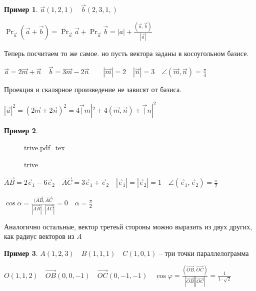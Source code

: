 \documentclass{book}
\theoremstyle{definition}
\newtheorem*{example}{Пример}
\newcommand\vect[1]{\overset{\longrightarrow}{#1}}
\newcommand{\incfig}[1]{%
    \def\svgwidth{\columnwidth}
    {#1.pdf_tex}
}
\begin{document}
    \begin{example}
        $\vec a(1, 2, 1)\quad \vec b\left( 2, 3, 1,  \right) $ 

        $\Pr_{\vec a}(\vec a + \vec b) = \Pr_{\vec a}\vec a + \Pr_{\vec a} \vec b = \left| a \right| + \frac{(\vec a,\vec b)}{\left| \vec a \right| }$
    
    Теперь посчитаем то же самое. но пусть вектора заданы в косоугольном базисе.

    $\vec a = 2\vec m + \vec n\quad \vec b = 3\vec m - 2\vec n\qquad \left| \vec m \right| =2 \quad \left| \vec n \right|  = 3\quad \angle(\vec m, \vec n) = \frac{\pi }{4}$

    Проекция и скалярное произведение не зависят от базиса.

    $\left| \vec a \right|^2  = (2\vec m + 2\vec n)^2 = 4\vec |m|^2 + 4(\vec m, \vec n) + \vec |n|^2$
    \end{example}
    \begin{example}
\begin{figure}[ht]
    \centering
    \incfig{trive}
    \caption{trive}
    \label{fig:trive}
\end{figure}

$\vec{AB} = 2\vec e_1 - 6\vec e_2\quad \vec{AC} = 3\vec e_1 + \vec e_2\quad \left| \vec e_1 \right|  = \left| \vec e_2 \right| =1\quad \angle\left( \vec e_1, \vec e_2 \right)  = \frac{\pi}{2} $ 

$\cos\alpha = \frac{(\vec{AB}, \vec {AC}}{\left| \vec{AB} \right| \cdot \left| \vec{AC} \right| } = 0\quad \alpha = \frac{\pi }{2}$

Аналогично остальные, вектор третеьй стороны можно выразить из двух других, как радиус векторов из $A$
    \end{example}

\begin{example}
    $A(1, 2, 3)\quad B(1, 1, 1)\quad C(1, 0, 1)$ -- три точки параллелограмма

    $O(1, 1, 2)\quad \vect{OB}(0,0,-1)\quad \vect{OC}(0,-1,-1)\quad \cos\varphi = \frac{\left( \vect{OB}, \vec{OC} \right) }{\left| \vect{OB} \right| \left| \vect{OC} \right| } = \frac{1}{1\cdot \sqrt{2} }$
\end{example}
\end{document}
